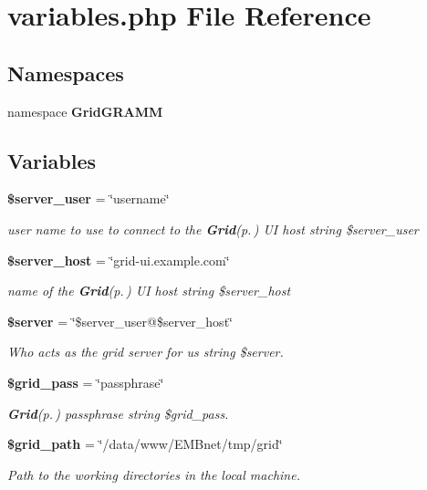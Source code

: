\section{variables.php File Reference}
\label{variables_8php}
\subsection*{Namespaces}
\begin{CompactItemize}
\item 
namespace {\bf Grid\-GRAMM}
\end{CompactItemize}
\subsection*{Variables}
\begin{CompactItemize}
\item 
{\bf \$server\_\-user} = \char`\"{}username\char`\"{}
\begin{CompactList}\small\item\em user name to use to connect to the {\bf Grid}{\rm (p.\,\pageref{classGrid})} UI host  string \$server\_\-user \item\end{CompactList}\item 
{\bf \$server\_\-host} = \char`\"{}grid-ui.example.com\char`\"{}
\begin{CompactList}\small\item\em name of the {\bf Grid}{\rm (p.\,\pageref{classGrid})} UI host  string \$server\_\-host \item\end{CompactList}\item 
{\bf \$server} = \char`\"{}\$server\_\-user@\$server\_\-host\char`\"{}
\begin{CompactList}\small\item\em Who acts as the grid server for us  string \$server. \item\end{CompactList}\item 
{\bf \$grid\_\-pass} = \char`\"{}passphrase\char`\"{}
\begin{CompactList}\small\item\em {\bf Grid}{\rm (p.\,\pageref{classGrid})} passphrase  string \$grid\_\-pass. \item\end{CompactList}\item 
{\bf \$grid\_\-path} = \char`\"{}/data/www/EMBnet/tmp/grid\char`\"{}
\begin{CompactList}\small\item\em Path to the working directories in the local machine. \item\end{CompactList}\end{CompactItemize}



